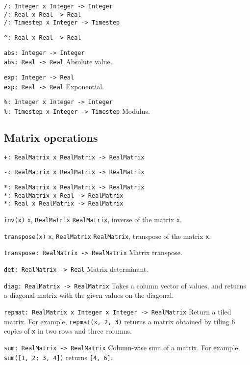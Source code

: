 \verb|/: Integer x Integer -> Integer| \\
\verb|/: Real x Real -> Real| \\
\verb|/: Timestep x Integer -> Timestep|

\verb|^: Real x Real -> Real|

\verb|abs: Integer -> Integer| \\
\verb|abs: Real -> Real| Absolute value.

\verb|exp: Integer -> Real| \\
\verb|exp: Real -> Real| Exponential.


\verb|%: Integer x Integer -> Integer| \\
\verb|%: Timestep x Integer -> Timestep| Modulus.


\subsection{Matrix operations}
\label{sec:builtin-matrix-ops}

\verb|+: RealMatrix x RealMatrix -> RealMatrix|

\verb|-: RealMatrix x RealMatrix -> RealMatrix|

\verb|*: RealMatrix x RealMatrix -> RealMatrix| \\
\verb|*: RealMatrix x Real -> RealMatrix| \\
\verb|*: Real x RealMatrix -> RealMatrix|

\verb|inv(x)|
 \verb|x|, \verb|RealMatrix| 
 \verb|RealMatrix|, inverse of the matrix \verb|x|.

\verb|transpose(x)|
 \verb|x|, \verb|RealMatrix| 
 \verb|RealMatrix|, transpose of the matrix \verb|x|.

\verb|transpose: RealMatrix -> RealMatrix| Matrix transpose.

\verb|det: RealMatrix -> Real| Matrix determinant.

\verb|diag: RealMatrix -> RealMatrix| Takes a column vector of values, and
returns a diagonal matrix with the given values on the diagonal.

\verb|repmat: RealMatrix x Integer x Integer -> RealMatrix| Return a tiled
matrix. For example, \verb|repmat(x, 2, 3)| returns a matrix obtained by tiling
6 copies of \verb|x| in two rows and three columns.

\verb|sum: RealMatrix -> RealMatrix| Column-wise sum of a matrix. For example,
\verb|sum([1, 2; 3, 4])| returns \verb|[4, 6]|.

